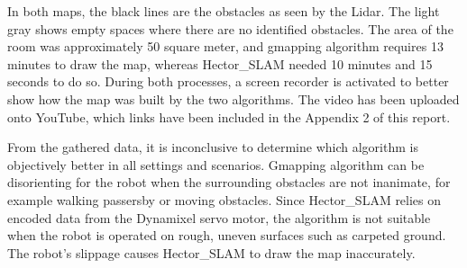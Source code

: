 \documentclass[12pt]{report}
\begin{document}
In both maps, the black lines are the obstacles as seen by the Lidar. The light gray shows empty spaces where there are no identified obstacles. The area of the room was approximately 50 square meter, and gmapping algorithm requires 13 minutes to draw the map, whereas Hector\_SLAM needed 10 minutes and 15 seconds to do so. During both processes, a screen recorder is activated to better show how the map was built by the two algorithms. The video has been uploaded onto YouTube, which links have been included in the Appendix 2 of this report.\par
\vspace{1em}
From the gathered data, it is inconclusive to determine which algorithm is objectively better in all settings and scenarios. Gmapping algorithm can be disorienting for the robot when the surrounding obstacles are not inanimate, for example walking passersby or moving obstacles. Since Hector\_SLAM relies on encoded data from the Dynamixel servo motor, the algorithm is not suitable when the robot is operated on rough, uneven surfaces such as carpeted ground. The robot’s slippage causes Hector\_SLAM to draw the map inaccurately.\par
\vspace{1em}
\end{document}
